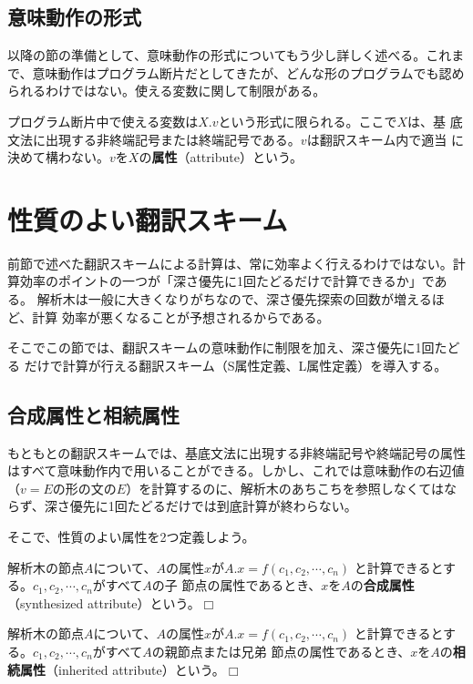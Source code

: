 \subsection{意味動作の形式}

以降の節の準備として、意味動作の形式についてもう少し詳しく述べる。これま
で、意味動作はプログラム断片だとしてきたが、どんな形のプログラムでも認め
られるわけではない。使える変数に関して制限がある。

プログラム断片中で使える変数は$X.v$という形式に限られる。ここで$X$は、基
底文法に出現する非終端記号または終端記号である。$v$は翻訳スキーム内で適当
に決めて構わない。$v$を$X$の{\bfseries 属性}（attribute）という。

\section{性質のよい翻訳スキーム}

前節で述べた翻訳スキームによる計算は、常に効率よく行えるわけではない。計
算効率のポイントの一つが「深さ優先に1回たどるだけで計算できるか」である。
解析木は一般に大きくなりがちなので、深さ優先探索の回数が増えるほど、計算
効率が悪くなることが予想されるからである。

そこでこの節では、翻訳スキームの意味動作に制限を加え、深さ優先に1回たどる
だけで計算が行える翻訳スキーム（S属性定義、L属性定義）を導入する。

\subsection{合成属性と相続属性}

もともとの翻訳スキームでは、基底文法に出現する非終端記号や終端記号の属性
はすべて意味動作内で用いることができる。しかし、これでは意味動作の右辺値
（$v=E$の形の文の$E$）を計算するのに、解析木のあちこちを参照しなくてはな
らず、深さ優先に1回たどるだけでは到底計算が終わらない。

そこで、性質のよい属性を2つ定義しよう。
\begin{definition}
 解析木の節点$A$について、$A$の属性$x$が$A.x = f(c_1, c_2, \cdots, c_n)$
 と計算できるとする。$c_1, c_2, \cdots, c_n$がすべて$A$の子
 節点の属性であるとき、$x$を$A$の{\bfseries 合成属性}（synthesized
 attribute）という。$\Box$
\end{definition}

\begin{definition}
 解析木の節点$A$について、$A$の属性$x$が$A.x = f(c_1, c_2, \cdots, c_n)$
 と計算できるとする。$c_1, c_2, \cdots, c_n$がすべて$A$の親節点または兄弟
 節点の属性であるとき、$x$を$A$の{\bfseries 相続属性}（inherited
 attribute）という。$\Box$
\end{definition}

